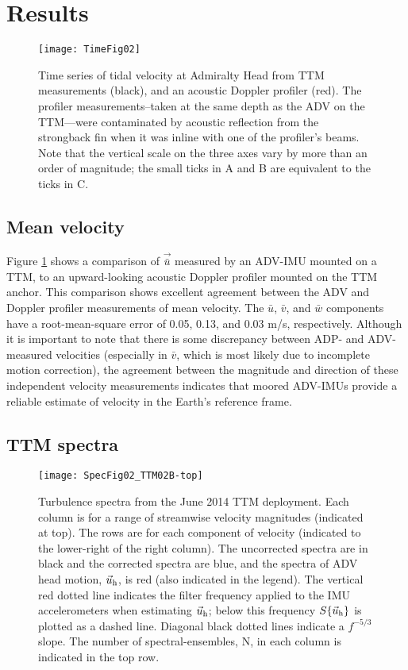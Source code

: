 \section{Results}
\label{sec:results}

\begin{figure}[t]
  \centering
  \texttt{[image: TimeFig02]}
  \caption{Time series of tidal velocity at Admiralty Head from TTM measurements (black), and an acoustic Doppler profiler (red). The profiler measurements--taken at the same depth as the ADV on the TTM---were contaminated by acoustic reflection from the strongback fin when it was inline with one of the profiler's beams. Note that the vertical scale on the three axes vary by more than an order of magnitude; the small ticks in A and B are equivalent to the ticks in C.}
  \label{fig:vel_time}
\end{figure}

\subsection{Mean velocity}

Figure \ref{fig:vel_time} shows a comparison of $\vec{\bar u}$ measured by an ADV-IMU mounted on a TTM, to an upward-looking acoustic Doppler profiler mounted on the TTM anchor. This comparison shows excellent agreement between the ADV and Doppler profiler measurements of mean velocity. The $\bar u$, $\bar v$, and $\bar w$ components have a root-mean-square error of 0.05, 0.13, and 0.03 m/s, respectively. Although it is important to note that there is some discrepancy between ADP- and ADV-measured velocities (especially in $\bar v$, which is most likely due to incomplete motion correction), the agreement between the magnitude and direction of these independent velocity measurements indicates that moored ADV-IMUs provide a reliable estimate of velocity in the Earth's reference frame.

\subsection{TTM spectra}

\begin{figure*}[t]
  \centering
  \texttt{[image: SpecFig02\_TTM02B-top]}
  \caption{Turbulence spectra from the June 2014 TTM deployment. Each column is for a range of streamwise velocity magnitudes (indicated at top). The rows are for each component of velocity (indicated to the lower-right of the right column). The uncorrected spectra are in black and the corrected spectra are blue, and the spectra of ADV head motion, $\vec{u}_\mathrm{h}$, is red (also indicated in the legend). The vertical red dotted line indicates the filter frequency applied to the IMU accelerometers when estimating $\vec{u}_\mathrm{h}$; below this frequency $S\{\vec{u}_\mathrm{h}\}$ is plotted as a dashed line.   Diagonal black dotted lines indicate a $f^{-5/3}$ slope. The number of spectral-ensembles, N, in each column is indicated in the top row.}
  \label{fig:spec:ttm}
\end{figure*}

